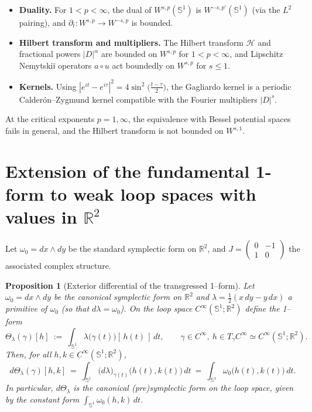 \documentclass{amsart}
\newcounter{thm}
\newcounter{ex}
\newcounter{re}
\newtheorem{proposition}[thm]{Proposition}
\begin{document}
\begin{itemize}
\item \textbf{Duality.} For $1<p<\infty$, the dual of $W^{s,p}(\mathbb S^1)$ is
$W^{-s,p'}(\mathbb S^1)$ (via the $L^2$ pairing), and
$\partial_t:W^{s,p}\to W^{-s,p}$ is bounded.
\item \textbf{Hilbert transform and multipliers.}
The Hilbert transform $\mathcal H$ and fractional powers $|D|^\alpha$
are bounded on $W^{s,p}$ for $1<p<\infty$, and Lipschitz Nemytski{\u i}
operators $a\circ u$ act boundedly on $W^{s,p}$ for $s\le 1$.
\item \textbf{Kernels.} Using $|e^{it}-e^{i\tau}|^2=4\sin^2\big(\frac{t-\tau}{2}\big)$,
the Gagliardo kernel is a periodic Calderón–Zygmund kernel compatible with
the Fourier multipliers $|D|^s$.
\end{itemize}


At the critical exponents $p=1,\infty$, the equivalence with Bessel potential spaces
fails in general, and the Hilbert transform is not bounded on $W^{s,1}$.






\section{Extension of the fundamental 1-form to weak loop spaces with values in $\mathbb R^2$}

Let $\omega_0=dx\wedge dy$ be the standard symplectic form on $\mathbb R^2$,
and $J=\left( \begin{array}{cc}0&-1\\1&0 \end{array} \right)$ the associated complex structure.

\begin{proposition}[Exterior differential of the transgressed 1--form]\label{prop:dTheta}
Let $\omega_0=dx\wedge dy$ be the canonical symplectic form on $\mathbb R^2$
and $\lambda=\tfrac12(x\,dy-y\,dx)$ a primitive of $\omega_0$ (so that $d\lambda=\omega_0$).
On the loop space $C^\infty(\mathbb S^1;\mathbb R^2)$ define the 1--form
\[
\Theta_\lambda(\gamma)[h]\ :=\ \int_{\mathbb S^1}\lambda\big(\gamma(t)\big)[\,h(t)\,]\,dt,
\qquad \gamma\in C^\infty,\ h\in T_\gamma C^\infty\simeq C^\infty(\mathbb S^1;\mathbb R^2).
\]
Then, for all $h,k\in C^\infty(\mathbb S^1;\mathbb R^2)$,
\[
d\Theta_\lambda(\gamma)[h,k]\ =\ \int_{\mathbb S^1} \big(d\lambda\big)_{\gamma(t)}\!\big(h(t),k(t)\big)\,dt
\ =\ \int_{\mathbb S^1}\omega_0\big(h(t),k(t)\big)\,dt.
\]
In particular, $d\Theta_\lambda$ is the canonical (pre)symplectic form on the loop space,
given by the constant form $\int_{\mathbb S^1}\omega_0(h,k)\,dt$.
\end{proposition}
\end{document}
